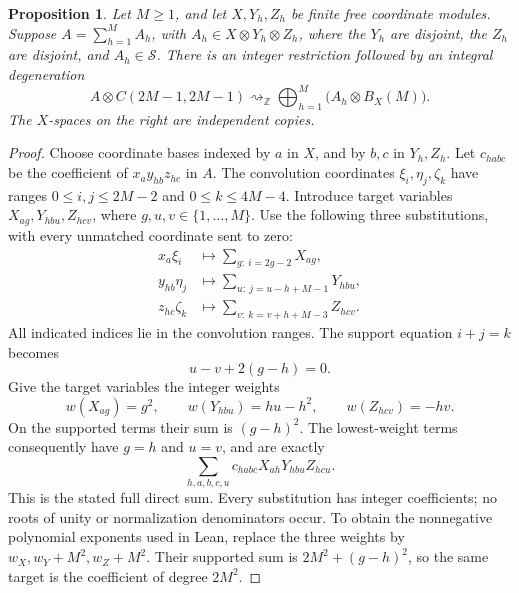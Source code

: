\documentclass[11pt]{article}
\newtheorem{proposition}[theorem]{Proposition}
\theoremstyle{remark}
\newcommand{\Z}{\mathbb Z}
\newcommand{\degto}{\mathrel{\rightsquigarrow_{\Z}}}
\begin{document}
\begin{proposition}\label{prop:sep}
Let $M\geq1$, and let $X,Y_h,Z_h$ be finite free coordinate modules.
Suppose $A=\sum_{h=1}^M A_h$, with
$A_h\in X\otimes Y_h\otimes Z_h$, where the $Y_h$ are disjoint,
the $Z_h$ are disjoint, and $A_h\in\mathcal S$.
There is an integer restriction followed by an integral degeneration
\[
 A\otimes C(2M-1,2M-1)\degto
 \bigoplus_{h=1}^M\bigl(A_h\otimes B_X(M)\bigr).
\]
The $X$-spaces on the right are independent copies.
\end{proposition}
\begin{proof}
Choose coordinate bases indexed by $a$ in $X$, and by $b,c$ in
$Y_h,Z_h$. Let $c_{habc}$ be the coefficient of $x_a y_{hb}z_{hc}$ in $A$.
The convolution coordinates $\xi_i,\eta_j,\zeta_k$ have ranges
$0\leq i,j\leq2M-2$ and $0\leq k\leq4M-4$.
Introduce target variables $X_{ag},Y_{hbu},Z_{hcv}$,
where $g,u,v\in\{1,\ldots,M\}$.
Use the following three substitutions, with every unmatched
coordinate sent to zero:
\begin{align*}
 x_a\xi_i&\longmapsto\sum_{g:\ i=2g-2}X_{ag},\\
 y_{hb}\eta_j&\longmapsto\sum_{u:\ j=u-h+M-1}Y_{hbu},\\
 z_{hc}\zeta_k&\longmapsto\sum_{v:\ k=v+h+M-3}Z_{hcv}.
\end{align*}
All indicated indices lie in the convolution ranges.
The support equation $i+j=k$ becomes
\[
 u-v+2(g-h)=0.
\]
Give the target variables the integer weights
\[
 w(X_{ag})=g^2,\qquad
 w(Y_{hbu})=hu-h^2,\qquad
 w(Z_{hcv})=-hv.
\]
On the supported terms their sum is $(g-h)^2$.
The lowest-weight terms consequently have $g=h$ and $u=v$,
and are exactly
\[
 \sum_{h,a,b,c,u}c_{habc}X_{ah}Y_{hbu}Z_{hcu}.
\]
This is the stated full direct sum. Every substitution has integer
coefficients; no roots of unity or normalization denominators occur.
To obtain the nonnegative polynomial exponents used in Lean, replace
the three weights by $w_X,w_Y+M^2,w_Z+M^2$. Their supported sum is
$2M^2+(g-h)^2$, so the same target is the coefficient of degree $2M^2$.
\end{proof}
\end{document}
